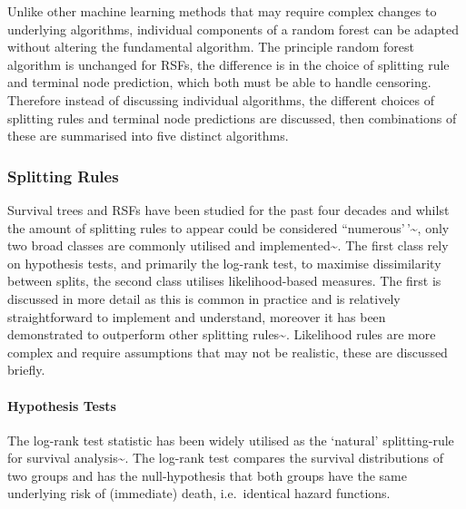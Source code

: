 \documentclass[
  letterpaper,
]{scrbook}
\let\oldparagraph\paragraph
\renewcommand{\paragraph}[1]{\oldparagraph{#1}\mbox{}}
\theoremstyle{plain}
\theoremstyle{definition}
\theoremstyle{remark}
\begin{document}
Unlike other machine learning methods that may require complex changes
to underlying algorithms, individual components of a random forest can
be adapted without altering the fundamental algorithm. The principle
random forest algorithm is unchanged for RSFs, the difference is in the
choice of splitting rule and terminal node prediction, which both must
be able to handle censoring. Therefore instead of discussing individual
algorithms, the different choices of splitting rules and terminal node
predictions are discussed, then combinations of these are summarised
into five distinct algorithms.

\subsubsection{Splitting Rules}

Survival trees and RSFs have been studied for the past four decades and
whilst the amount of splitting rules to appear could be considered
``numerous'\,'\textasciitilde{}\cite{Bou-Hamad2011}, only two broad
classes are commonly utilised and
implemented\textasciitilde{}\cite{pkgrfsrc, pkgsksurvival, pkgrpart, pkgranger}.
The first class rely on hypothesis tests, and primarily the log-rank
test, to maximise dissimilarity between splits, the second class
utilises likelihood-based measures. The first is discussed in more
detail as this is common in practice and is relatively straightforward
to implement and understand, moreover it has been demonstrated to
outperform other splitting rules\textasciitilde{}\cite{Bou-Hamad2011}.
Likelihood rules are more complex and require assumptions that may not
be realistic, these are discussed briefly.

\paragraph{Hypothesis Tests}

The log-rank test statistic has been widely utilised as the `natural'
splitting-rule for survival
analysis\textasciitilde{}\cite{Ciampi1986, Ishwaran2008, LeBlanc1993, Segal1988}.
The log-rank test compares the survival distributions of two groups and
has the null-hypothesis that both groups have the same underlying risk
of (immediate) death, i.e.~identical hazard functions.
\end{document}
